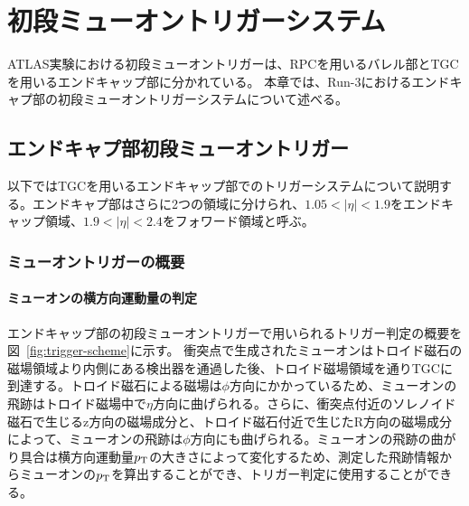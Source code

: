 \chapter{初段ミューオントリガーシステム}\label{chapter3}
ATLAS実験における初段ミューオントリガーは、RPCを用いるバレル部とTGCを用いるエンドキャップ部に分かれている。
本章では、Run-3におけるエンドキャプ部の初段ミューオントリガーシステムについて述べる。

\section{エンドキャプ部初段ミューオントリガー}
以下ではTGCを用いるエンドキャップ部でのトリガーシステムについて説明する。エンドキャプ部はさらに2つの領域に分けられ、$1.05 < |\eta| < 1.9$をエンドキャップ領域、$1.9 < |\eta| < 2.4$をフォワード領域と呼ぶ。

\subsection{ミューオントリガーの概要}\label{section:CW}

\subsubsection{ミューオンの横方向運動量の判定}
エンドキャップ部の初段ミューオントリガーで用いられるトリガー判定の概要を図~\ref{fig:trigger-scheme}に示す。
衝突点で生成されたミューオンはトロイド磁石の磁場領域より内側にある検出器を通過した後、トロイド磁場領域を通りTGCに到達する。トロイド磁石による磁場は$\phi$方向にかかっているため、ミューオンの飛跡はトロイド磁場中で$\eta$方向に曲げられる。さらに、衝突点付近のソレノイド磁石で生じるz方向の磁場成分と、トロイド磁石付近で生じたR方向の磁場成分によって、ミューオンの飛跡は$\phi$方向にも曲げられる。ミューオンの飛跡の曲がり具合は横方向運動量$p_{\rm{T}}$の大きさによって変化するため、測定した飛跡情報からミューオンの$p_{\rm{T}}$を算出することができ、トリガー判定に使用することができる。

